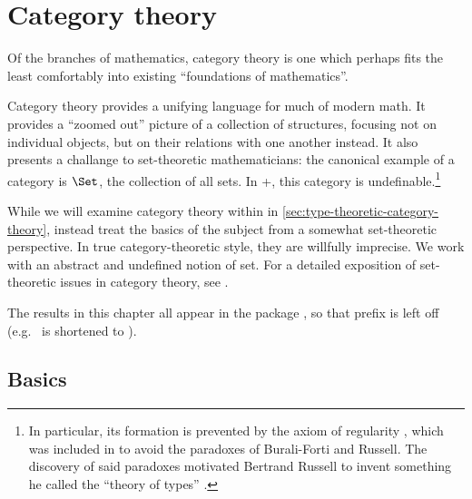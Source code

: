 \documentclass[./thesis.tex]{subfiles}
\begin{document}
\chapter{Category theory}
\label{chap:category-theory}

\epigraph{Of the branches of mathematics, category theory is one which perhaps
fits the least comfortably into existing ``foundations of
mathematics''.}{\cite{rezk}}

Category theory provides a unifying language for much of modern math. It
provides a ``zoomed out'' picture of a collection of structures, focusing not on
individual objects, but on their relations with one another instead. 
It also presents a challange to set-theoretic mathematicians: the
canonical example of a category is $\Set$, the collection of all sets. In
\ZFC+\FOL{}, this category is undefinable.\footnote{In
  particular, its formation is prevented by the axiom of regularity
  \cite{vonneumann}, which was included in \ZFC{} to avoid the
  paradoxes of Burali-Forti and Russell. The discovery of said paradoxes
  motivated Bertrand Russell to invent something he called the ``theory of
  types'' \cite{russell}.}

While we will examine category theory within \UTT{} in
\cref{sec:type-theoretic-category-theory},
instead treat the basics of the subject from a somewhat set-theoretic
perspective. In true category-theoretic style, they are willfully
imprecise. We work with an abstract and undefined notion of set. For a detailed
exposition of set-theoretic issues in category theory, see \cite{shulmanset}.

The results in this chapter all appear in the \UniMath{} package
, so that prefix is left off
(e.g.\  is shortened to
).

\section{Basics}
\label{sec:basics}
\end{document}
